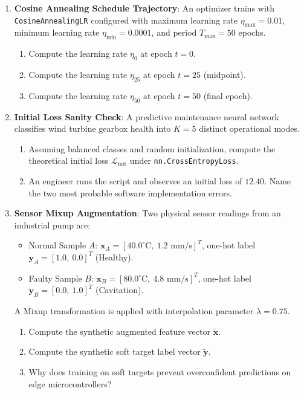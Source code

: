 \begin{checkyourself}
\begin{enumerate}
    \item \textbf{Cosine Annealing Schedule Trajectory}:
    An optimizer trains with \texttt{CosineAnnealingLR} configured with maximum learning rate $\eta_{\max} = 0.01$, minimum learning rate $\eta_{\min} = 0.0001$, and period $T_{\max} = 50$ epochs.
    \begin{enumerate}[label=(\alph*)]
        \item Compute the learning rate $\eta_0$ at epoch $t = 0$.
        \item Compute the learning rate $\eta_{25}$ at epoch $t = 25$ (midpoint).
        \item Compute the learning rate $\eta_{50}$ at epoch $t = 50$ (final epoch).
    \end{enumerate}

    \item \textbf{Initial Loss Sanity Check}:
    A predictive maintenance neural network classifies wind turbine gearbox health into $K = 5$ distinct operational modes.
    \begin{enumerate}[label=(\alph*)]
        \item Assuming balanced classes and random initialization, compute the theoretical initial loss $\mathcal{L}_{\text{init}}$ under \texttt{nn.CrossEntropyLoss}.
        \item An engineer runs the script and observes an initial loss of $12.40$. Name the two most probable software implementation errors.
    \end{enumerate}

    \item \textbf{Sensor Mixup Augmentation}:
    Two physical sensor readings from an industrial pump are:
    \begin{itemize}
        \item Normal Sample $A$: $\mathbf{x}_A = [40.0^\circ\text{C}, \ 1.2\text{ mm/s}]^T$, one-hot label $\mathbf{y}_A = [1.0, \ 0.0]^T$ (Healthy).
        \item Faulty Sample $B$: $\mathbf{x}_B = [80.0^\circ\text{C}, \ 4.8\text{ mm/s}]^T$, one-hot label $\mathbf{y}_B = [0.0, \ 1.0]^T$ (Cavitation).
    \end{itemize}
    A Mixup transformation is applied with interpolation parameter $\lambda = 0.75$.
    \begin{enumerate}[label=(\alph*)]
        \item Compute the synthetic augmented feature vector $\tilde{\mathbf{x}}$.
        \item Compute the synthetic soft target label vector $\tilde{\mathbf{y}}$.
        \item Why does training on soft targets prevent overconfident predictions on edge microcontrollers?
    \end{enumerate}
\end{enumerate}
\end{checkyourself}


